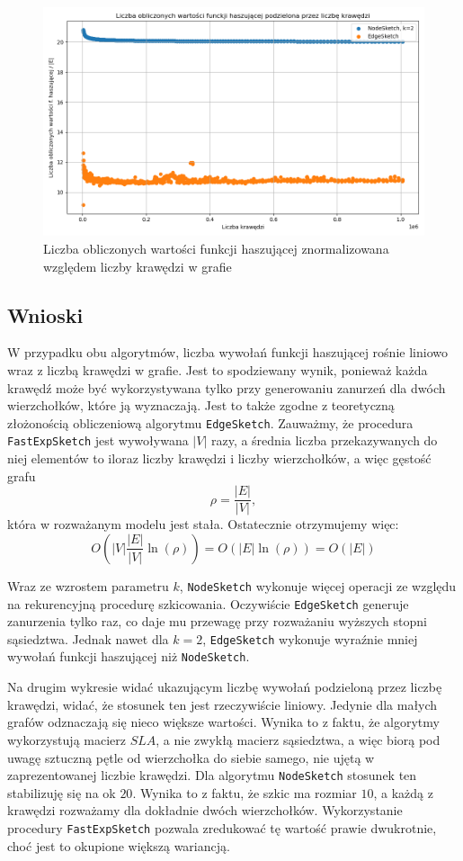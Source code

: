 \begin{figure}[!ht]
    \includegraphics[width=16cm]{img/calculated_hashes_vs_edges_relative.png}
    \centering
    \caption[Liczba operacji znormalizowana]{Liczba obliczonych wartości funkcji haszującej znormalizowana względem liczby krawędzi w grafie}
    \label{fig:calculated_hashes_vs_edges_relative}
\end{figure}

\subsection{Wnioski}
W przypadku obu algorytmów, liczba wywołań funkcji haszującej rośnie liniowo wraz z liczbą krawędzi w grafie. Jest to spodziewany wynik, ponieważ każda krawędź może być wykorzystywana tylko przy generowaniu zanurzeń dla dwóch wierzchołków, które ją wyznaczają. Jest to także zgodne z teoretyczną złożonością obliczeniową algorytmu \texttt{EdgeSketch}. Zauważmy, że procedura \texttt{FastExpSketch} jest wywoływana $|V|$ razy, a średnia liczba przekazywanych do niej elementów to iloraz liczby krawędzi i liczby wierzchołków, a więc gęstość grafu 
\[
    \rho = \frac{|E|}{|V|},
\]
która w rozważanym modelu jest stała. Ostatecznie otrzymujemy więc:
\[
    O(|V| \frac{|E|}{|V|} \ln(\rho)) = O(|E| \ln(\rho)) = O(|E|)
\]

Wraz ze wzrostem parametru $k$, \texttt{NodeSketch} wykonuje więcej operacji ze względu na rekurencyjną procedurę szkicowania. Oczywiście \texttt{EdgeSketch} generuje zanurzenia tylko raz, co daje mu przewagę przy rozważaniu wyższych stopni sąsiedztwa. Jednak nawet dla $k = 2$, \texttt{EdgeSketch} wykonuje wyraźnie mniej wywołań funkcji haszującej niż \texttt{NodeSketch}.

Na drugim wykresie widać ukazującym liczbę wywołań podzieloną przez liczbę krawędzi, widać, że stosunek ten jest rzeczywiście liniowy. Jedynie dla małych grafów odznaczają się nieco większe wartości. Wynika to z faktu, że algorytmy wykorzystują macierz $SLA$, a nie zwykłą macierz sąsiedztwa, a więc biorą pod uwagę sztuczną pętle od wierzchołka do siebie samego, nie ujętą w zaprezentowanej liczbie krawędzi. Dla algorytmu \texttt{NodeSketch} stosunek ten stabilizuję się na ok $20$. Wynika to z faktu, że szkic ma rozmiar $10$, a każdą z krawędzi rozważamy dla dokładnie dwóch wierzchołków. Wykorzystanie procedury \texttt{FastExpSketch} pozwala zredukować tę wartość prawie dwukrotnie, choć jest to okupione większą wariancją.  
